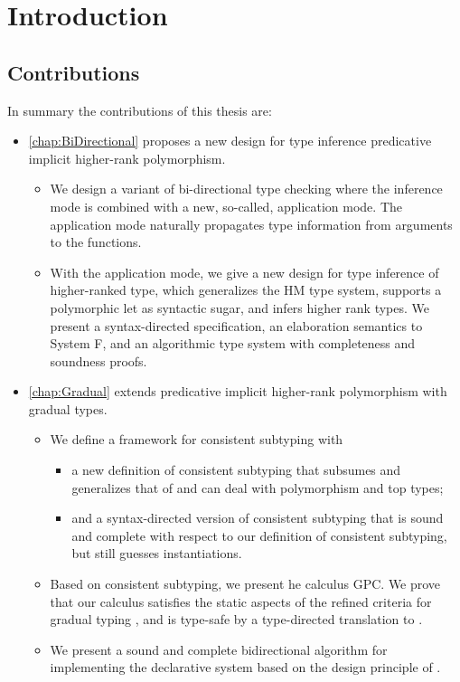 \chapter{Introduction}


\section{Contributions}

In summary the contributions of this thesis are:

\begin{itemize}

\item \cref{chap:BiDirectional} proposes a new design for type inference
  predicative implicit higher-rank polymorphism.
  \begin{itemize}
  \item We design a variant of bi-directional type checking
    where the inference mode is combined with a new, so-called, application
    mode. The application mode naturally propagates type information from
    arguments to the functions.
  \item With the application mode, we give a new design for type inference of
    higher-ranked type, which generalizes the HM type system, supports a
    polymorphic let as syntactic sugar, and infers higher rank types. We present
    a syntax-directed specification, an elaboration semantics to System F, and
    an algorithmic type system with completeness and soundness proofs.
  \end{itemize}

\item \cref{chap:Gradual} extends predicative implicit higher-rank
  polymorphism with gradual types.
  \begin{itemize}
  \item We define a framework for consistent subtyping with
    \begin{itemize}
    \item a new definition of
    consistent subtyping that subsumes and generalizes that of
    \cite{siek:consistent:subtyping} and can deal with polymorphism and top
    types;
    \item and a syntax-directed version of consistent subtyping that is sound
    and complete with respect to our definition of consistent subtyping, but
    still guesses instantiations.
    \end{itemize}
  \item Based on consistent subtyping, we present he calculus GPC. We prove that
    our calculus satisfies the static aspects of the refined criteria for
    gradual typing \citep{siek:criteria}, and is type-safe by a type-directed
    translation to \pbc \citep{amal:blame}.
  \item We present a sound and complete
    bidirectional algorithm for implementing the declarative system based on
    the design principle of \cite{garcia:principal}.
  \end{itemize}
  

\end{itemize}
